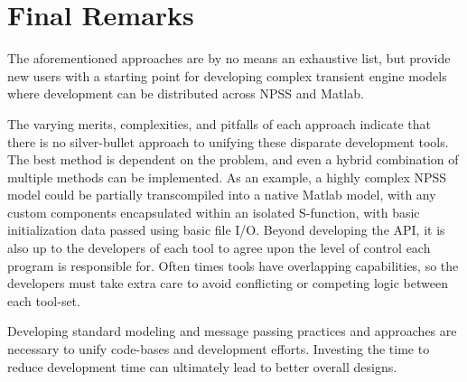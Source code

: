 \documentclass[heading.tex]{subfiles}
\begin{document}
\section{Final Remarks}

The aforementioned approaches are by no means an exhaustive list,
but provide new users with a starting point for developing complex transient engine models
where development can be distributed across NPSS and Matlab.

The varying merits, complexities, and pitfalls of each approach indicate that there is
no silver-bullet approach to unifying these disparate development tools.
The best method is dependent on the problem,
and even a hybrid combination of multiple methods can be implemented.
As an example, a highly complex NPSS model could be partially transcompiled into a native Matlab model,
with any custom components encapsulated within an isolated S-function,
with basic initialization data passed using basic file I/O.
Beyond developing the API, it is also up to the developers of each tool to
agree upon the level of control each program is responsible for.
Often times tools have overlapping capabilities, so the developers must take extra care to
avoid conflicting or competing logic between each tool-set.

Developing standard modeling and message passing practices and approaches are necessary to unify
code-bases and development efforts.
Investing the time to reduce development time can ultimately lead to better overall designs.
\end{document}
